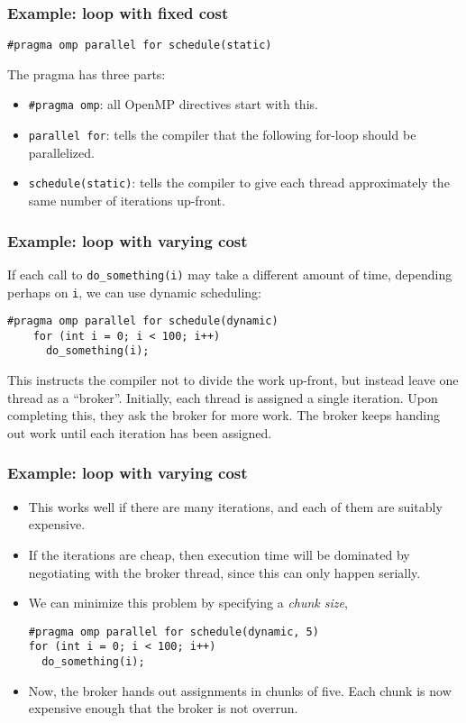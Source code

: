 \begin{frame}[fragile]
  \frametitle{Example: loop with fixed cost}
  \begin{lstlisting}[style=c]
    #pragma omp parallel for schedule(static)
  \end{lstlisting}
  The pragma has three parts:
  \begin{itemize}
  \item \texttt{\#pragma omp}: all OpenMP directives start with this.
  \item \texttt{parallel for}: tells the compiler that the following for-loop
    should be parallelized.
  \item \texttt{schedule(static)}: tells the compiler to give each thread
    approximately the same number of iterations up-front.
  \end{itemize}
\end{frame}

\begin{frame}[fragile]
  \frametitle{Example: loop with varying cost}
  If each call to \texttt{do\_something(i)} may take a different amount of time,
  depending perhaps on \texttt{i}, we can use dynamic scheduling:
  \begin{lstlisting}[style=c]
    #pragma omp parallel for schedule(dynamic)
    for (int i = 0; i < 100; i++)
      do_something(i);
  \end{lstlisting}
  This instructs the compiler not to divide the work up-front, but instead leave
  one thread as a ``broker''. Initially, each thread is assigned a single
  iteration. Upon completing this, they ask the broker for more work. The broker
  keeps handing out work until each iteration has been assigned.
\end{frame}

\begin{frame}[fragile]
  \frametitle{Example: loop with varying cost}
  \begin{itemize}
  \item This works well if there are many iterations, and each of them are
    suitably expensive.
  \item If the iterations are cheap, then execution time will be dominated by
    negotiating with the broker thread, since this can only happen serially.
  \item We can minimize this problem by specifying a \emph{chunk size},
  \begin{lstlisting}[style=c]
#pragma omp parallel for schedule(dynamic, 5)
for (int i = 0; i < 100; i++)
  do_something(i);
  \end{lstlisting}
  \item Now, the broker hands out assignments in chunks of five. Each chunk is
    now expensive enough that the broker is not overrun.
  \end{itemize}
\end{frame}


